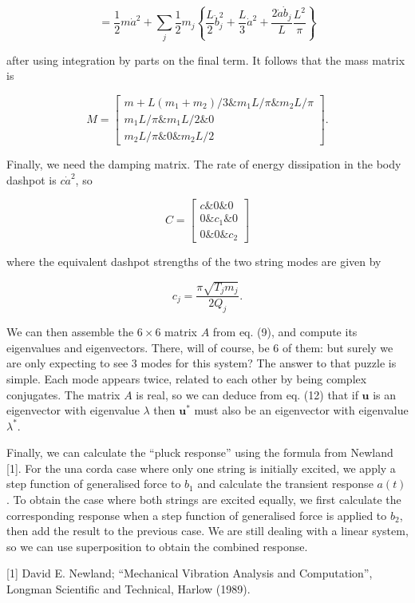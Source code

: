   $$= \frac{1}{2} m \dot{a}^2 +\sum_j{\dfrac{1}{2}m_j \left\lbrace \dfrac{L}{2} 
  \dot{b}_j^2 + \dfrac{L}{3} \dot{a}^2 + \dfrac{2 \dot{a} \dot{b}_j}{L} 
  \dfrac{L^2}{\pi}\right\rbrace } \tag{16}$$ 

  after using integration by parts on the final term. It follows that the mass 
  matrix is 

  $$M =\begin{bmatrix}m+L(m_1+m_2)/3 \& m_1 L /\pi \& m_2 L/\pi\\ m_1 L /\pi \& 
  m_1 L /2 \& 0 \\ m_2 L /\pi \& 0 \& m_2 L /2\end{bmatrix} . \tag{17}$$ 

  Finally, we need the damping matrix. The rate of energy dissipation in the 
  body dashpot is $c \dot{a}^2$, so 

  $$C = \begin{bmatrix}c \& 0 \& 0 \\ 0 \& c_1 \& 0 \\ 0 \& 0 \& c_2 
  \end{bmatrix} \tag{18}$$ 

  where the equivalent dashpot strengths of the two string modes are given by 

  $$c_j = \dfrac{\pi \sqrt{T_j m_j}}{2 Q_j} . \tag{19}$$ 

  We can then assemble the $6 \times 6$ matrix $A$ from eq. (9), and compute 
  its eigenvalues and eigenvectors. There, will of course, be 6 of them: but 
  surely we are only expecting to see 3 modes for this system? The answer to 
  that puzzle is simple. Each mode appears twice, related to each other by 
  being complex conjugates. The matrix $A$ is real, so we can deduce from eq. 
  (12) that if $\mathbf{u}$ is an eigenvector with eigenvalue $\lambda$ then 
  $\mathbf{u}^*$ must also be an eigenvector with eigenvalue $\lambda^*$. 

  Finally, we can calculate the ``pluck response'' using the formula from 
  Newland [1]. For the una corda case where only one string is initially 
  excited, we apply a step function of generalised force to $b_1$ and calculate 
  the transient response $a(t)$. To obtain the case where both strings are 
  excited equally, we first calculate the corresponding response when a step 
  function of generalised force is applied to $b_2$, then add the result to the 
  previous case. We are still dealing with a linear system, so we can use 
  superposition to obtain the combined response. 

  \sectionreferences{}[1] David E. Newland; ``Mechanical Vibration Analysis and 
  Computation'', Longman Scientific and Technical, Harlow (1989). 